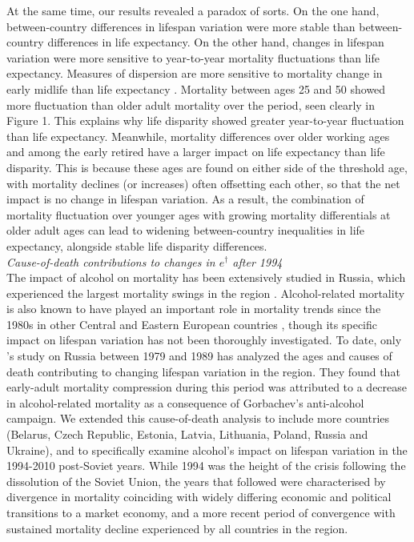 \documentclass{article}
\begin{document}
\begin{spacing}{1.5}
At the same time, our results revealed a paradox of sorts. On the one hand, between-country differences in lifespan variation were more stable than between-country differences in life expectancy. On the other hand, changes in lifespan variation were more sensitive to year-to-year mortality fluctuations than life expectancy. Measures of dispersion are more sensitive to mortality change in early midlife than life expectancy \citep{vanraalte2013}. Mortality between ages 25 and 50 showed more fluctuation than older adult mortality over the period, seen clearly in Figure 1. This explains why life disparity showed greater year-to-year fluctuation than life expectancy. Meanwhile, mortality differences over older working ages and among the early retired have a larger impact on life expectancy than life disparity. This is because these ages are found on either side of the threshold age, with mortality declines (or increases) often offsetting each other, so that the net impact is no change in lifespan variation. As a result, the combination of mortality fluctuation over younger ages with growing mortality differentials at older adult ages can lead to widening between-country inequalities in life expectancy, alongside stable life disparity differences.
\\

\emph{Cause-of-death contributions to changes in $e^\dagger$ after 1994}\\

The impact of alcohol on mortality has been extensively studied in Russia, which experienced the largest mortality swings in the region \citep{leon1997huge,rehm2007, shkolnikov2013components,shkolnikov2001}. Alcohol-related mortality is also known to have played an important role in mortality trends since the 1980s in other Central and Eastern European countries \citep{ rehm2007}, though its specific impact on lifespan variation has not been thoroughly investigated. To date, only \citet{shkolnikov2003}'s study on Russia between 1979 and 1989 has analyzed the ages and causes of death contributing to changing lifespan variation in the region. They found that early-adult mortality compression during this period was attributed to a decrease in alcohol-related mortality as a consequence of Gorbachev's anti-alcohol campaign. We extended this cause-of-death analysis to include more countries (Belarus, Czech Republic, Estonia, Latvia, Lithuania, Poland, Russia and Ukraine), and to specifically examine alcohol's impact on lifespan variation in the 1994-2010 post-Soviet years. While 1994 was the height of the crisis following the dissolution of the Soviet Union, the years that followed were characterised by divergence in mortality coinciding with widely differing economic and political transitions to a market economy, and a more recent period of convergence with sustained mortality decline experienced by all countries in the region.\\


\end{spacing}
\end{document}
